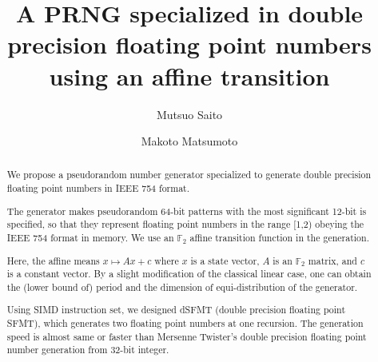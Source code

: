 \documentclass{svmult}
\def\bbf2{\ifmmode \mathbb{F}_2 \else $\mathbb{F}_2$ \fi}
\begin{document}
\newcommand{\mmod}{\textrm{mod}\,}

\title*{A PRNG specialized in double precision floating point numbers
  using an affine transition}


\author{Mutsuo Saito\and
Makoto Matsumoto}
%

\maketitle
            
\begin{abstract} 
  We propose a pseudorandom number generator specialized to
  generate double precision floating point numbers in IEEE 754 format.

  The generator makes pseudorandom 64-bit patterns with the most
  significant 12-bit is specified, so that they represent floating
  point numbers in the range [1,2) obeying the IEEE 754 format in
  memory. We use an $\mathbb{F}_2$ affine transition function in the
  generation.

  Here, the affine means $x \mapsto Ax+c$ where
  $x$ is a state vector, $A$ is an $\mathbb{F}_2$
  matrix, and $c$ is a constant vector. 
  By a slight modification of the classical linear case,
  one can obtain the (lower bound of) period and the dimension of
  equi-distribution of the generator.

  Using SIMD instruction set, we designed dSFMT (double precision floating
  point SFMT), which generates two floating point numbers at one recursion.
  The generation speed is almost same or faster than Mersenne Twister's
  double precision floating point number generation from 32-bit integer.
\end{abstract}
\end{document}
